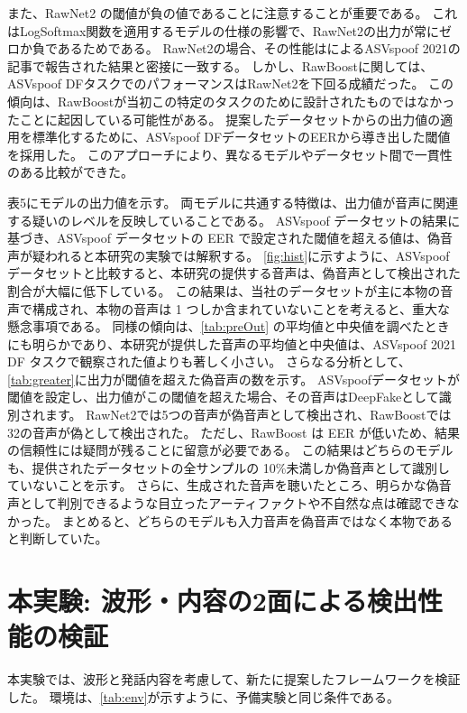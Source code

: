 また、RawNet2 の閾値が負の値であることに注意することが重要である。
これはLogSoftmax関数を適用するモデルの仕様の影響で、RawNet2の出力が常にゼロか負であるためである。
RawNet2の場合、その性能は\cite{yamagishi21_asvspoof}によるASVspoof 2021の記事で報告された結果と密接に一致する。
しかし、RawBoostに関しては、ASVspoof DFタスクでのパフォーマンスはRawNet2を下回る成績だった。
この傾向は、RawBoostが当初この特定のタスクのために設計されたものではなかったことに起因している可能性がある。
提案したデータセットからの出力値の適用を標準化するために、ASVspoof DFデータセットのEERから導き出した閾値を採用した。
このアプローチにより、異なるモデルやデータセット間で一貫性のある比較ができた。

表5にモデルの出力値を示す。
両モデルに共通する特徴は、出力値が音声に関連する疑いのレベルを反映していることである。
ASVspoof データセットの結果に基づき、ASVspoof データセットの EER で設定された閾値を超える値は、偽音声が疑われると本研究の実験では解釈する。
\cref{fig:hist}に示すように、ASVspoof データセットと比較すると、本研究の提供する音声は、偽音声として検出された割合が大幅に低下している。
この結果は、当社のデータセットが主に本物の音声で構成され、本物の音声は 1 つしか含まれていないことを考えると、重大な懸念事項である。
同様の傾向は、\cref{tab:preOut} の平均値と中央値を調べたときにも明らかであり、本研究が提供した音声の平均値と中央値は、ASVspoof 2021 DF タスクで観察された値よりも著しく小さい。
さらなる分析として、\cref{tab:greater}に出力が閾値を超えた偽音声の数を示す。
ASVspoofデータセットが閾値を設定し、出力値がこの閾値を超えた場合、その音声はDeepFakeとして識別されます。
RawNet2では5つの音声が偽音声として検出され、RawBoostでは32の音声が偽として検出された。
ただし、RawBoost は EER が低いため、結果の信頼性には疑問が残ることに留意が必要である。
この結果はどちらのモデルも、提供されたデータセットの全サンプルの 10\%未満しか偽音声として識別していないことを示す。
さらに、生成された音声を聴いたところ、明らかな偽音声として判別できるような目立ったアーティファクトや不自然な点は確認できなかった。
まとめると、どちらのモデルも入力音声を偽音声ではなく本物であると判断していた。


\section{本実験: 波形・内容の2面による検出性能の検証}\label{sec:cnt_main}
本実験では、波形と発話内容を考慮して、新たに提案したフレームワークを検証した。
環境は、\ref{tab:env}が示すように、予備実験と同じ条件である。

